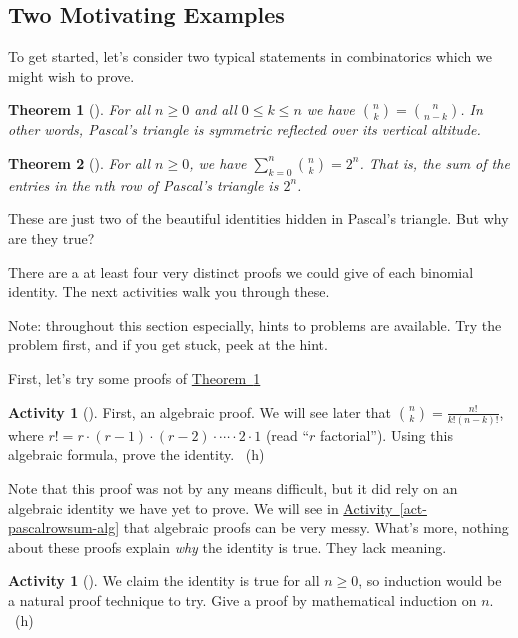 \documentclass[10pt,]{book}
\theoremstyle{plain}
\newtheorem{theorem}{Theorem}[section]
\theoremstyle{definition}
\theoremstyle{definition}
\theoremstyle{definition}
\newtheorem{activity}[project]{Activity}
\numberwithin{equation}{chapter}
\begin{document}
\subsection[{Two Motivating Examples}]{Two Motivating Examples}\label{subsec-basic-proofs-examples}
\hypertarget{p-545}{}%
To get started, let's consider two typical statements in combinatorics which we might wish to prove.%
\begin{theorem}[{}]\label{thm-pascalsym}
\hypertarget{p-546}{}%
For all \(n \ge 0\) and all \(0 \le k \le n\) we have \(\binom{n}{k} = \binom{n}{n-k}\).  In other words, Pascal's triangle is symmetric reflected over its vertical altitude.%
\end{theorem}
\begin{theorem}[{}]\label{thm-pascalrowsum}
\hypertarget{p-547}{}%
For all \(n \ge 0\), we have \(\sum_{k=0}^n \binom{n}{k} = 2^n\).  That is, the sum of the entries in the \(n\)th row of Pascal's triangle is \(2^n\).%
\end{theorem}
\hypertarget{p-548}{}%
These are just two of the beautiful identities hidden in Pascal's triangle.  But why are they true?%
\par
\hypertarget{p-549}{}%
There are a at least four very distinct proofs we could give of each binomial identity.  The next activities walk you through these.%
\par
\hypertarget{p-550}{}%
Note: throughout this section especially, hints to problems are available.  Try the problem first, and if you get stuck, peek at the hint.%
\par
\hypertarget{p-551}{}%
First, let's try some proofs of \hyperref[thm-pascalsym]{Theorem~\ref{thm-pascalsym}}%
\begin{activity}[]\label{activity-65}
\hypertarget{p-552}{}%
First, an algebraic proof.  We will see later that \(\binom{n}{k} = \frac{n!}{k!(n-k)!}\), where \(r! = r \cdot (r-1) \cdot (r-2) \cdot\cdots\cdot 2\cdot 1\) (read ``\(r\) factorial'').  Using this algebraic formula, prove the identity.%
~{\tiny (h)}\end{activity}
\hypertarget{p-554}{}%
Note that this proof was not by any means difficult, but it did rely on an algebraic identity we have yet to prove.  We will see in \hyperref[act-pascalrowsum-alg]{Activity~\ref{act-pascalrowsum-alg}} that algebraic proofs can be very messy.  What's more, nothing about these proofs explain \emph{why} the identity is true.  They lack meaning.%
\begin{activity}[]\label{activity-66}
\hypertarget{p-555}{}%
We claim the identity is true for all \(n \ge 0\), so induction would be a natural proof technique to try.  Give a proof by mathematical induction on \(n\).%
~{\tiny (h)}\end{activity}
\end{document}
